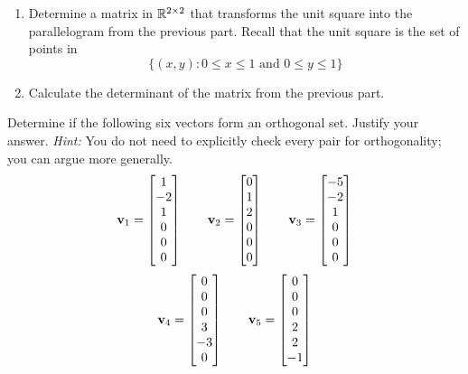 \begin{tasks}[resume, style=enumerate]
\begin{enumerate}[label=(\alph*)]
  \item Determine a matrix in $\mathbb R^{2\times 2}$ that transforms the
    unit square into the parallelogram from the previous part.  Recall
    that the unit square is the set of points in
    \begin{displaymath}
      \{(x, y) : 0 \leq x \leq 1 \text{ and } 0 \leq y \leq 1\}
    \end{displaymath}
  \item Calculate the determinant of the matrix from the previous part.
  \end{enumerate}
\task
  Determine if the following six vectors form an orthogonal set.
  Justify your answer. \textit{Hint:} You do not need to explicitly
  check every pair for orthogonality; you can argue more generally.
  \begin{displaymath}
    \mathbf v_1 = \begin{bmatrix} 1 \\ -2 \\ 1 \\ 0 \\ 0 \\ 0 \end{bmatrix}
    \qquad
    \mathbf v_2 = \begin{bmatrix} 0 \\ 1 \\ 2 \\ 0 \\ 0 \\ 0 \end{bmatrix}
    \qquad
    \mathbf v_3 = \begin{bmatrix} -5 \\ -2 \\ 1 \\ 0 \\ 0 \\ 0 \end{bmatrix}
  \end{displaymath}
  \begin{displaymath}
    \vv_4 = \begin{bmatrix} 0 \\ 0 \\ 0 \\ 3 \\ -3 \\ 0 \end{bmatrix}
    \qquad
    \vv_5 = \begin{bmatrix} 0 \\ 0 \\ 0 \\ 2 \\ 2 \\ -1 \end{bmatrix}

\end{displaymath}
\end{tasks}

